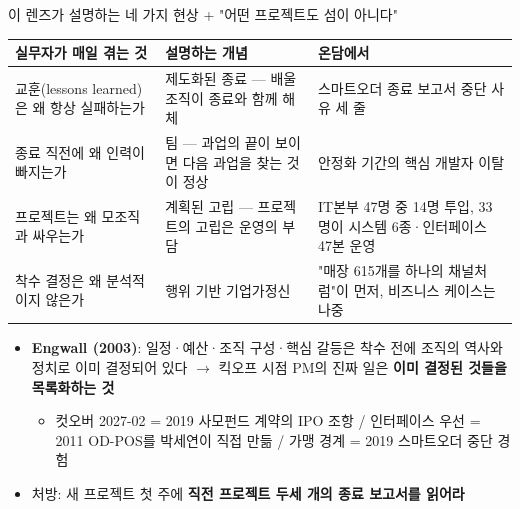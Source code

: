 \begin{frame}[allowframebreaks=1.0]{이 렌즈가 설명하는 네 가지 현상 + "어떤 프로젝트도 섬이 아니다"}
\small
{\footnotesize\setlength{\tabcolsep}{3pt}\renewcommand{\arraystretch}{1.12}
\begin{tabular}{@{}>{\raggedright\arraybackslash}p{}>{\raggedright\arraybackslash}p{}>{\raggedright\arraybackslash}p{}@{}}
\toprule
\textbf{실무자가 매일 겪는 것} & \textbf{설명하는 개념} & \textbf{온담에서} \\
\midrule
교훈(lessons learned)은 왜 항상 실패하는가 & 제도화된 종료 — 배울 조직이 종료와 함께 해체 & 스마트오더 종료 보고서 중단 사유 세 줄 \\
종료 직전에 왜 인력이 빠지는가 & 팀 — 과업의 끝이 보이면 다음 과업을 찾는 것이 정상 & 안정화 기간의 핵심 개발자 이탈 \\
프로젝트는 왜 모조직과 싸우는가 & 계획된 고립 — 프로젝트의 고립은 운영의 부담 & IT본부 47명 중 14명 투입, 33명이 시스템 6종·인터페이스 47본 운영 \\
착수 결정은 왜 분석적이지 않은가 & 행위 기반 기업가정신 & "매장 615개를 하나의 채널처럼"이 먼저, 비즈니스 케이스는 나중 \\
\bottomrule
\end{tabular}}
\par\smallskip
\begin{itemize}
\item\relax \textbf{Engwall (2003)}: 일정·예산·조직 구성·핵심 갈등은 착수 전에 조직의 역사와 정치로 이미 결정되어 있다 $\rightarrow$ 킥오프 시점 PM의 진짜 일은 \textbf{이미 결정된 것들을 목록화하는 것}
\par\nobreak
\begin{itemize}
\item\relax 컷오버 2027-02 = 2019 사모펀드 계약의 IPO 조항 / 인터페이스 우선 = 2011 OD-POS를 박세연이 직접 만듦 / 가맹 경계 = 2019 스마트오더 중단 경험
\end{itemize}
\item\relax 처방: 새 프로젝트 첫 주에 \textbf{직전 프로젝트 두세 개의 종료 보고서를 읽어라}
\end{itemize}
\end{frame}

